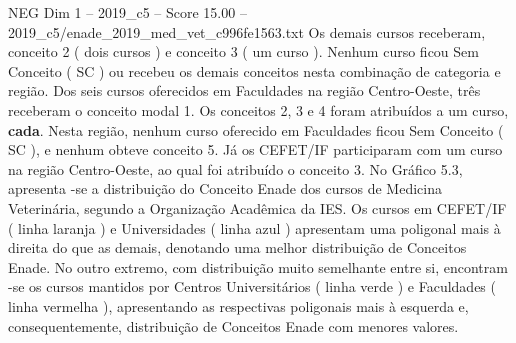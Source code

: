 \begin{textsample}{NEG Dim 1 – 2019\_c5 – Score 15.00 – 2019\_c5/enade\_2019\_med\_vet\_c996fe1563.txt}
Os demais cursos receberam, conceito 2 ( dois cursos ) e conceito 3 ( um curso ).
Nenhum curso ficou Sem Conceito ( SC ) ou recebeu os demais conceitos nesta combinação de categoria e região.
Dos seis cursos oferecidos em Faculdades na região Centro-Oeste, três receberam o conceito modal 1.
Os conceitos 2, 3 e 4 foram atribuídos a um curso, \textbf{cada}.
Nesta região, nenhum curso oferecido em Faculdades ficou Sem Conceito ( SC ), e nenhum obteve conceito 5.
Já os CEFET/IF participaram com um curso na região Centro-Oeste, ao qual foi atribuído o conceito 3.
No Gráfico 5.3, apresenta -se a distribuição do Conceito Enade dos cursos de Medicina Veterinária, segundo a Organização Acadêmica da IES.
Os cursos em CEFET/IF ( linha laranja ) e Universidades ( linha azul ) apresentam uma poligonal mais à direita do que as demais, denotando uma melhor distribuição de Conceitos Enade.
No outro extremo, com distribuição muito semelhante entre si, encontram -se os cursos mantidos por Centros Universitários ( linha verde ) e Faculdades ( linha vermelha ), apresentando as respectivas poligonais mais à esquerda e, consequentemente, distribuição de Conceitos Enade com menores valores.

\end{textsample}
